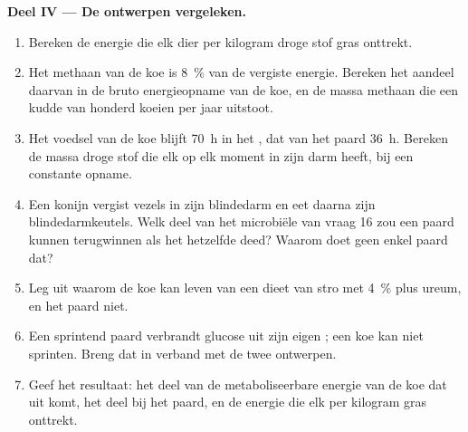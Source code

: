 \begin{problem}
\medskip
\noindent\textbf{Deel IV --- De ontwerpen vergeleken.}
\begin{enumerate}[resume]
  \item Bereken de energie die elk dier per kilogram droge stof gras
        onttrekt.
  \item Het methaan van de koe is \qty{8}{\%} van de vergiste energie.
        Bereken het aandeel daarvan in de bruto energieopname van de
        koe, en de massa methaan die een kudde van honderd koeien per
        jaar uitstoot.
  \item Het voedsel van de koe blijft \qty{70}{h} in het , dat van
        het paard \qty{36}{h}. Bereken de massa droge stof die elk op
        elk moment in zijn darm heeft, bij een constante opname.
  \item Een konijn vergist vezels in zijn blindedarm en eet daarna zijn
        blindedarmkeutels. Welk deel van het microbiële  van vraag
        16 zou een paard kunnen terugwinnen als het hetzelfde deed?
        Waarom doet geen enkel paard dat?
  \item Leg uit waarom de koe kan leven van een dieet van stro met
        \qty{4}{\%}  plus ureum, en het paard niet.
  \item Een sprintend paard verbrandt glucose uit zijn eigen ;
        een koe kan niet sprinten. Breng dat in verband met de twee
        ontwerpen.
  \item Geef het resultaat: het deel van de metaboliseerbare energie van
        de koe dat uit  komt, het deel bij het paard,
        en de energie die elk per kilogram gras onttrekt.
\end{enumerate}
\end{problem}
